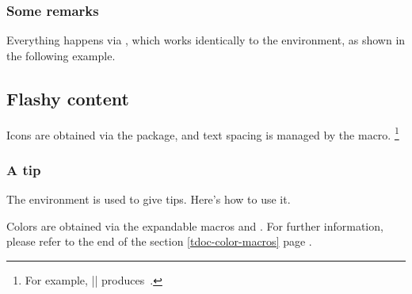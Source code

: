 



\subsubsection{Some remarks}

Everything happens via , which works identically to the  environment, as shown in the following example.




\subsection{Flashy content} \label{tdoc-colorful-focus}

\begin{tdocnote}
    Icons are obtained via the  package, and text spacing is managed by the  macro.
    \footnote{
        For example,
        \tdocinlatex||
        produces\,
        .
    }
\end{tdocnote}


\subsubsection{A tip}

The  environment is used to give tips. Here's how to use it.




\smallskip

\begin{tdocnote}
    Colors are obtained via the expandable macros  and .
    For further information, please refer to the end of the section \ref{tdoc-color-macros} page \pageref{tdoc-color-macros}.
\end{tdocnote}



